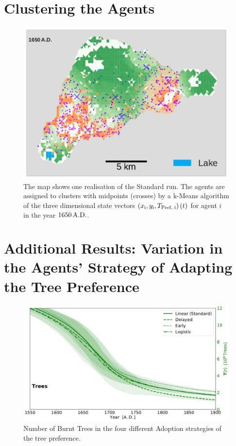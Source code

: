 \section{Clustering the Agents}
\begin{figure}[h]
	\centering
	\includegraphics[width=1\linewidth]{images/ClusterSTDS1650}
	\caption{The map shows one realisation of the Standard run. The agents are assigned to clusters with midpoints (crosses) by a k-Means algorithm of the three dimensional state vectors $\left( x_{\rm i}, y_{\rm i}, T_\text{Pref, i} \right)(t)$ for agent $i$ in the year $1650\, {\rm A.D.}$.}
	\label{fig:clusterstds1650}
\end{figure}

\FloatBarrier
\section{Additional Results: Variation in the Agents' Strategy of Adapting the Tree Preference}
\begin{figure}[h]
	\centering
	\includegraphics[width=1\linewidth]{images/Results/TPref/TPrefAdaption_Trees}
	\caption{Number of Burnt Trees in the four different Adoption strategies of the tree preference.}
	\label{fig:tprefadaptiontrees}
\end{figure}

